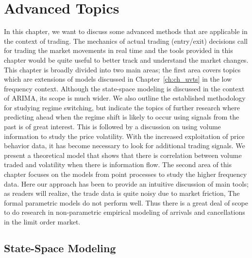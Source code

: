 \chapter{Advanced Topics\label{ch:ch_advanced}}

In this chapter,\label{in:adv_model} we want to discuss some advanced methods that are applicable in the context of trading. The mechanics of actual trading (entry/exit) decisions call for trading the market movements in real time and the tools provided in this chapter would be quite useful to better track and understand the market changes. This chapter is broadly divided into two main areas; the first area covers topics which are extensions of models discussed in Chapter~\ref{ch:ch_uvts} in the low frequency context. Although the state-space modeling is discussed in the context of ARIMA, its scope is much wider. We also outline the established methodology for studying regime switching, but indicate the topics of further research where predicting ahead when the regime shift is likely to occur using signals from the past is of great interest. This is followed by a discussion on using volume information to study the price volatility. With the increased exploitation of price behavior data, it has become necessary to look for additional trading signals. We present a theoretical model that shows that there is correlation between volume traded and volatility when there is information flow. The second area of this chapter focuses on the models from point processes to study the higher frequency data. Here our approach has been to provide an intuitive discussion of main tools; as readers will realize, the trade data is quite noisy due to market friction, The formal parametric models do not perform well. Thus there is a great deal of scope to do research in non-parametric empirical modeling of arrivals and cancellations in the limit order market. 



\section{State-Space Modeling\label{sec:state_space}}

